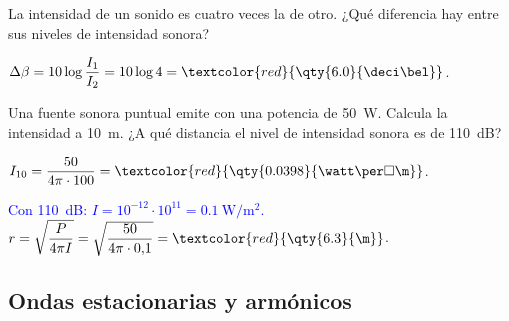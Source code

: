 \begin{exercise}
    La intensidad de un sonido es cuatro veces la de otro. ¿Qué diferencia hay entre sus niveles de intensidad sonora?
    \begin{solu}
        \(\Delta\beta = 10\log\dfrac{I_1}{I_2} = 10\log 4 = \textcolor{red}{\qty{6.0}{\deci\bel}}\).
    \end{solu}
\end{exercise}

\begin{exercise}
    Una fuente sonora puntual emite con una potencia de \qty{50}{\watt}. Calcula la intensidad a \qty{10}{\m}. ¿A qué
    distancia el nivel de intensidad sonora es de \qty{110}{\deci\bel}?
    \begin{solu}
        \(I_{10} = \dfrac{50}{4\pi\cdot 100} = \textcolor{red}{\qty{0.0398}{\watt\per\square\m}}\).

        \textcolor{blue}{Con \qty{110}{\deci\bel}: \(I = 10^{-12}\cdot 10^{11} = \qty{0.1}{\watt\per\square\m}\).}
        \(r = \sqrt{\dfrac{P}{4\pi I}} = \sqrt{\dfrac{50}{4\pi\cdot 0{,}1}} = \textcolor{red}{\qty{6.3}{\m}}\).
    \end{solu}
\end{exercise}

\subsection{Ondas estacionarias y armónicos}

